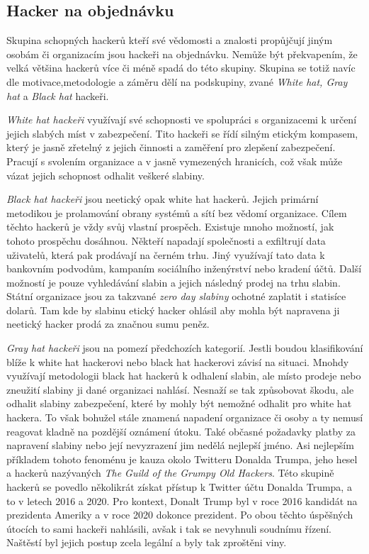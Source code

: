 \subsection{Hacker na objednávku}
Skupina schopných hackerů kteří své vědomosti a znalosti propůjčují jiným osobám či organizacím jsou hackeři na objednávku.
Nemůže být překvapením, že velká většina hackerů více či méně spadá do této skupiny.
Skupina se totiž navíc dle motivace,metodologie a záměru dělí na podskupiny, zvané \textit{White hat, Gray hat} a \textit{Black hat} hackeři.

\textit{White hat hackeři} využívají své schopnosti ve spolupráci s organizacemi k určení jejich slabých míst v zabezpečení.
Tito hackeři se řídí silným etickým kompasem, který je jasně zřetelný z jejich činnosti a zaměření pro zlepšení zabezpečení.
Pracují s svolením organizace a v jasně vymezených hranicích, což však může vázat jejich schopnost odhalit veškeré slabiny.

\textit{Black hat hackeři} jsou neetický opak white hat hackerů.
Jejich primární metodikou je prolamování obrany systémů a sítí bez vědomí organizace.
Cílem těchto hackerů je vždy svůj vlastní prospěch.
Existuje mnoho možností, jak tohoto prospěchu dosáhnou.
Někteří napadají společnosti a exfiltrují data uživatelů, která pak prodávají na černém trhu.
Jiný využívají tato data k bankovním podvodům, kampaním sociálního inženýrství nebo kradení účtů.
Další možností je pouze vyhledávání slabin a jejich následný prodej na trhu slabin.
Státní organizace jsou za takzvané \textit{zero day slabiny} ochotné zaplatit i statisíce dolarů\cite{world_end_2021}.
Tam kde by slabinu etický hacker ohlásil aby mohla být napravena ji neetický hacker prodá za značnou sumu peněz.

\textit{Gray hat hackeři} jsou na pomezí předchozích kategorií.
Jestli boudou klasifikování blíže k white hat hackerovi nebo black hat hackerovi závisí na situaci.
Mnohdy využívají metodologii black hat hackerů k odhalení slabin, ale místo prodeje nebo zneužití slabiny ji dané organizaci nahlásí.
Nesnaží se tak způsobovat škodu, ale odhalit slabiny zabezpečení, které by mohly být nemožné odhalit pro white hat hackera.
To však bohužel stále znamená napadení organizace či osoby a ty nemusí reagovat kladně na pozdější oznámení útoku.
Také občasné požadavky platby za napravení slabiny nebo její nevyzrazení jim nedělá nejlepší jméno.
Asi nejlepším příkladem tohoto fenoménu je kauza okolo Twitteru Donalda Trumpa, jeho hesel a hackerů nazývaných \textit{The Guild of the Grumpy Old Hackers}\cite{darknet_87_grumpy}.
Této skupině hackerů se povedlo několikrát získat přístup k Twitter účtu Donalda Trumpa, a to v letech 2016 a 2020.
Pro kontext, Donalt Trump byl v roce 2016 kandidát na prezidenta Ameriky a v roce 2020 dokonce prezident.
Po obou těchto úspěšných útocích to sami hackeři nahlásili, avšak i tak se nevyhnuli soudnímu řízení.
Naštěstí byl jejich postup zcela legální a byly tak zproštěni viny.

